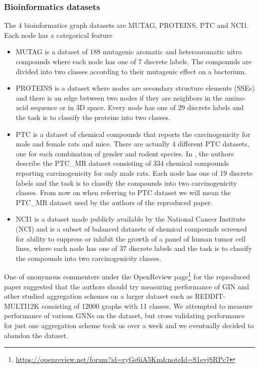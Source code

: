 \documentclass{article} %
\begin{document}
\subsubsection{Bioinformatics datasets}
The 4 bioinformatics graph datasets are MUTAG, PROTEINS, PTC and NCI1. Each node has a categorical feature
\begin{itemize}
    \item MUTAG is a dataset of 188 mutagenic aromatic and heteroaromatic nitro compounds where each node has one of 7 discrete labels. The compounds are divided into two classes according to their mutagenic effect on a bacterium.
    \item PROTEINS is a dataset where nodes are secondary structure elements (SSEs) and there is an edge between two nodes if they are neighbors in the amino-acid sequence or in 3D space. Every node has one of 29 discrete labels and the task is to classify the proteins into two classes.
    \item PTC is a dataset of chemical compounds that reports the carcinogenicity for male and female rats and mice. There are actually 4 different PTC datasets, one for each combination of gender and rodent species. In \cite{ThePaper}, the authors describe the PTC\_MR dataset consisting of 334 chemical compounds reporting carcinogenicity for only male rats. Each node has one of 19 discrete labels and the task is to classify the compounds into two carcinogenicity classes. From now on when referring to PTC dataset we will mean the PTC\_MR dataset used by the authors of the reproduced paper.
    \item NCI1 is a dataset made publicly available by the National Cancer Institute (NCI) and is a subset of balanced datasets of chemical compounds screened for ability to suppress or inhibit the growth of a panel of human tumor cell lines, where each node has one of 37 discrete labels and the task is to classify the compounds into two carcinogenicity classes.
\end{itemize}

One of anonymous commenters under the OpenReview page\footnote{\url{https://openreview.net/forum?id=ryGs6iA5Km&noteId=S1evjSRPc7}} for the reproduced paper suggested that the authors should try measuring performance of GIN and other studied aggregation schemes on a larger dataset such as REDDIT-MULTI12K consisting of 12000 graphs with 11 classes. We attempted to measure performance of various GNNs on the dataset, but cross validating performance for just one aggregation scheme took us over a week and we eventually decided to abandon the dataset.
\end{document}
